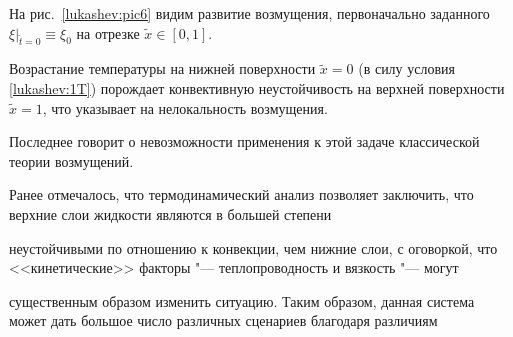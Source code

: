 

















На рис.~\ref{lukashev:pic6} видим развитие возмущения, первоначально заданного ${\xi\bigr|_{\widetilde t=0}\equiv\xi_0}$ на отрезке $\widetilde x\in[0, 1]$.

Возрастание температуры на нижней поверхности $\widetilde{x}=0$ (в силу условия \eqref{lukashev:1T}) порождает конвективную неустойчивость на верхней поверхности $\widetilde{x}=1$, что указывает на нелокальность возмущения.

Последнее говорит о невозможности применения к этой задаче классической теории возмущений.



Ранее отмечалось, что термодинамический анализ позволяет заключить, что верхние слои жидкости являются в большей степени

неустойчивыми по отношению к конвекции, чем нижние слои, с оговоркой, что <<кинетические>> факторы "--- теплопроводность и вязкость "--- могут

существенным образом изменить ситуацию. Таким образом, данная система может дать большое число различных сценариев благодаря различиям

